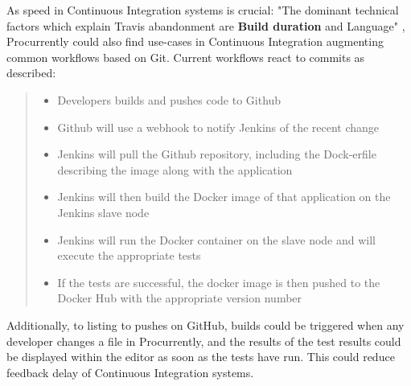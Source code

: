 As speed in Continuous Integration systems is crucial: "The dominant technical factors which explain Travis abandonment are \textbf{Build duration} and Language" \cite{8595199}, Procurrently could also find use-cases in Continuous Integration augmenting common workflows based on Git. 
Current workflows react to commits as described:

\blockquote[{\cite{8695332}}]{
    \begin{itemize}
        \item Developers builds and pushes code to Github
        \item Github will use a webhook to notify Jenkins of the recent change
        \item Jenkins will pull the Github repository, including the Dock-erfile describing the image along with the application
        \item Jenkins will then build the Docker image of that application on the Jenkins slave node
        \item Jenkins will run the Docker container on the slave node and will execute the appropriate tests
        \item If the tests are successful, the docker image is then pushed to the Docker Hub with the appropriate version number
    \end{itemize}
}

Additionally, to listing to pushes on GitHub, builds could be triggered when any developer changes a file in Procurrently, and the results of the test results could be displayed within the editor as soon as the tests have run. This could reduce feedback delay of Continuous Integration systems.